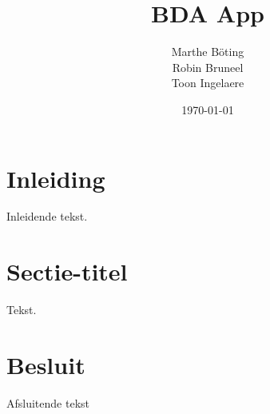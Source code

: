 \documentclass[a4paper,kulak]{kulakarticle}
\date{\today}
\title{BDA App}
\author{Marthe B\"{o}ting\\
	Robin Bruneel\\
	Toon Ingelaere}
\begin{document}
	
	
	\maketitle

\section*{Inleiding}

Inleidende tekst.
\pagebreak


\section{Sectie-titel}

Tekst.

\section*{Besluit}

Afsluitende tekst


\end{document}
